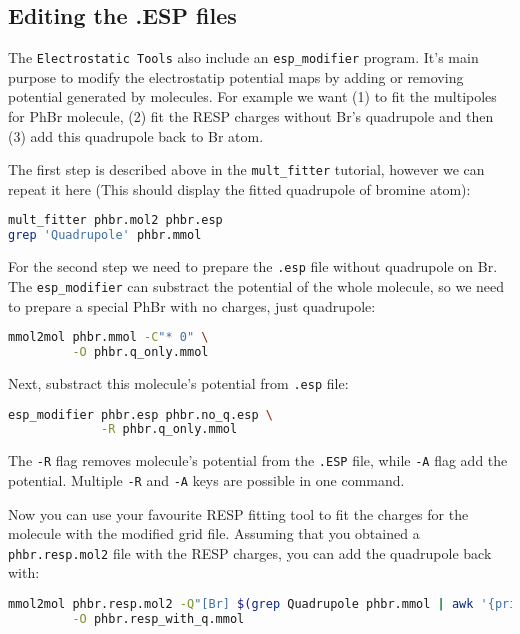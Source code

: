 \documentclass[10pt,a4paper]{article}
\begin{document}
\subsection{Editing the .ESP files}
The \lstinline{Electrostatic Tools} also include an \lstinline{esp_modifier} program.
It's main purpose to modify the electrostatip potential maps by adding or removing 
potential generated by molecules. For example we want (1) to fit the multipoles for 
PhBr molecule, (2) fit the RESP charges without Br's quadrupole 
and then (3) add this quadrupole back to Br atom.

The first step is described above in the \lstinline{mult_fitter} tutorial, however we can 
repeat it here (This should display the fitted quadrupole of bromine atom):
\begin{lstlisting}[language=bash]
mult_fitter phbr.mol2 phbr.esp
grep 'Quadrupole' phbr.mmol
\end{lstlisting}
For the second step we need to prepare the \lstinline{.esp} file without quadrupole on Br.
The \lstinline{esp_modifier} can substract the potential of the whole molecule, so we need 
to prepare a special PhBr with no charges, just quadrupole:
\begin{lstlisting}[language=bash]
mmol2mol phbr.mmol -C"* 0" \
         -O phbr.q_only.mmol
\end{lstlisting}
Next, substract this molecule's potential from \lstinline{.esp} file:
\begin{lstlisting}[language=bash]
esp_modifier phbr.esp phbr.no_q.esp \
             -R phbr.q_only.mmol
\end{lstlisting}
The \lstinline{-R} flag removes molecule's potential from the \lstinline{.ESP} file, 
while \lstinline{-A} flag add the potential. Multiple \lstinline{-R} and \lstinline{-A} 
keys are possible in one command.

Now you can use your favourite RESP fitting tool to fit the charges for the molecule with 
the modified grid file. Assuming that you obtained a \lstinline{phbr.resp.mol2} file with 
the RESP charges, you can add the quadrupole back with:
\begin{lstlisting}[language=bash]
mmol2mol phbr.resp.mol2 -Q"[Br] $(grep Quadrupole phbr.mmol | awk '{print $11}')" \
         -O phbr.resp_with_q.mmol
\end{lstlisting}
\end{document}
